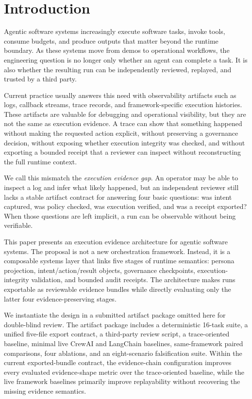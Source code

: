 \section{Introduction}

Agentic software systems increasingly execute software tasks, invoke tools, consume budgets, and produce outputs that matter beyond the runtime boundary. As these systems move from demos to operational workflows, the engineering question is no longer only whether an agent can complete a task. It is also whether the resulting run can be independently reviewed, replayed, and trusted by a third party.

Current practice usually answers this need with observability artifacts such as logs, callback streams, trace records, and framework-specific execution histories. These artifacts are valuable for debugging and operational visibility, but they are not the same as execution evidence. A trace can show that something happened without making the requested action explicit, without preserving a governance decision, without exposing whether execution integrity was checked, and without exporting a bounded receipt that a reviewer can inspect without reconstructing the full runtime context.

We call this mismatch the \emph{execution evidence gap}. An operator may be able to inspect a log and infer what likely happened, but an independent reviewer still lacks a stable artifact contract for answering four basic questions: was intent captured, was policy checked, was execution verified, and was a receipt exported? When those questions are left implicit, a run can be observable without being verifiable.

This paper presents an execution evidence architecture for agentic software systems. The proposal is not a new orchestration framework. Instead, it is a composable systems layer that links five stages of runtime semantics: persona projection, intent/action/result objects, governance checkpoints, execution-integrity validation, and bounded audit receipts. The architecture makes runs exportable as reviewable evidence bundles while directly evaluating only the latter four evidence-preserving stages.

We instantiate the design in a submitted artifact package omitted here for double-blind review. The artifact package includes a deterministic 16-task suite, a unified five-file export contract, a third-party review script, a trace-oriented baseline, minimal live CrewAI and LangChain baselines, same-framework paired comparisons, four ablations, and an eight-scenario falsification suite. Within the current exported-bundle contract, the evidence-chain configuration improves every evaluated evidence-shape metric over the trace-oriented baseline, while the live framework baselines primarily improve replayability without recovering the missing evidence semantics.

